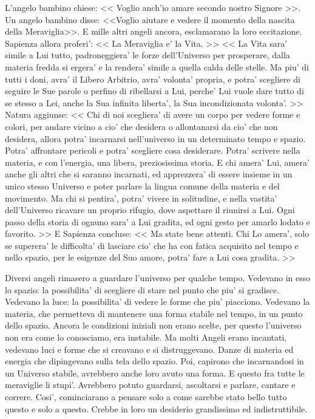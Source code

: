   L'angelo bambino chiese: << Voglio anch'io amare secondo nostro Signore >>. Un angelo bambino disse: <<Voglio aiutare e vedere il momento della nascita della Meraviglia>>. E mille altri angeli ancora, esclamarano la loro eccitazione.
  Sapienza allora proferi': << La Meraviglia e' la Vita. >>
<< La Vita sara' simile a Lui tutto, padroneggiera' le forze dell'Universo per prosperare, dalla materia fredda si ergera' e la rendera' simile a quella calda delle stelle. Ma piu' di tutti i doni, avra' il Libero Arbitrio, avra' volonta' propria, e potra' scegliere di seguire le Sue parole o perfino di ribellarsi a Lui, perche' Lui vuole dare tutto di se stesso a Lei, anche la Sua infinita liberta', la Sua incondizionata volonta'. >>
  Natura aggiunse:
<< Chi di noi scegliera' di avere un corpo per vedere forme e colori, per andare vicino a cio' che desidera o allontanarsi da cio' che non desidera, allora potra' incarnarsi nell'universo in un determinato tempo e spazio. Potra' affrontare pericoli e potra' scegliere cosa desiderare. Potra' scrivere nella materia, e con l'energia, una libera, preziosissima storia. E chi amera' Lui, amera' anche gli altri che si saranno incarnati, ed apprezzera' di essere insieme in un unico stesso Universo e poter parlare la lingua comune della materia e del movimento. Ma chi si pentira', potra' vivere in solitudine, e nella vastita' dell'Universo ricavare un proprio rifugio, dove aspettare il riunirsi a Lui. Ogni passo della storia di ognuno sara' a Lui gradita, ed ogni gesto per amarlo lodato e favorito. >>
  E Sapienza concluse:
<< Ma state bene attenti. Chi Lo amera', solo se superera' le difficolta' di lasciare cio' che ha con fatica acquisito nel tempo e nello spazio, per le esigenze del Suo amore, potra' fare a Lui cosa gradita. >>

Diversi angeli rimasero a guardare l'universo per qualche tempo.
Vedevano in esso lo spazio: la possibilita' di scegliere di stare nel punto che piu' si gradisce. Vedevano la luce: la possibilita' di vedere le forme che piu' piacciono. Vedevano la materia, che permetteva di mantenere una forma stabile nel tempo, in un punto dello spazio.
  Ancora le condizioni iniziali non erano scelte, per questo l'universo non era come lo conosciamo, era instabile. Ma molti Angeli erano incantati, vedevano luci e forme che si creavano e si distruggevano. Danze di materia ed energia che dipingevano sulla tela dello spazio. Poi, capirono che incarnandosi in un Universo stabile, avrebbero anche loro avuto una forma. E questo fra tutte le meraviglie li stupi'. Avrebbero potuto guardarsi, ascoltarsi e parlare, cantare e correre.
Cosi', cominciarano a pensare solo a come sarebbe stato bello tutto questo e solo a questo. Crebbe in loro un desiderio grandissimo ed indistruttibile.


